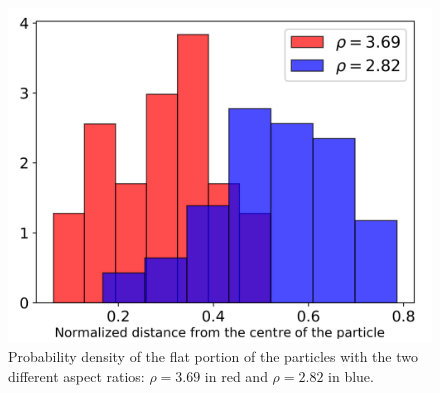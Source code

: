 \documentclass[aip,graphicx]{revtex4-1}
\begin{document}
\begin{figure}
    \centering
    \includegraphics[width=0.7\columnwidth]{maxlength_div.png}
    \caption{Probability density of the flat portion of the particles with the two different aspect ratios: $\rho=3.69$ in red and $\rho=2.82$ in blue.}
    \label{fig:maxlength_div}
\end{figure}


\end{document}
